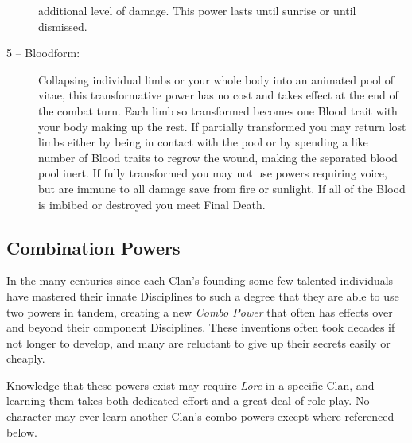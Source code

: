 \begin{description}
	additional level of damage.  This power lasts until sunrise or until dismissed.
	\item[5 -- Bloodform:]  Collapsing individual limbs or your whole body into an animated pool of vitae, 
	this transformative power has no cost and takes effect at the end of the combat turn.  Each limb so 
	transformed becomes one Blood trait with your body making up the rest.  If partially transformed you 
	may return lost limbs either by being in contact with the pool or by spending a like number of Blood 
	traits to regrow the wound, making the separated blood pool inert.  If fully transformed you may not 
	use powers requiring voice, but are immune to all damage save from fire or sunlight.  If all of the 
	Blood is imbibed or destroyed you meet Final Death.
\end{description}

\subsection{Combination Powers}
In the many centuries since each Clan's founding some few talented individuals have mastered their 
innate Disciplines to such a degree that they are able to use two powers in tandem, creating a new 
\emph{Combo Power} that often has effects over and beyond their component Disciplines.  These 
inventions often took decades if not longer to develop, and many are reluctant to give up their 
secrets easily or cheaply.

Knowledge that these powers exist may require \emph{Lore} in a specific Clan, and learning them 
takes both dedicated effort and a great deal of role-play.  No character may ever learn another Clan's 
combo powers except where referenced below.

